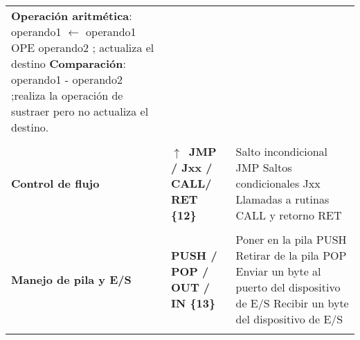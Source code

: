 \documentclass[12pt,twoside]{templates/unerthesis}
\begin{document}
\begin{longtable}[]{@{}lll@{}}
\begin{minipage}[t]{0.30\columnwidth}
\textbf{Operación aritmética}: operando1 \(\leftarrow\) operando1 OPE operando2 ; actualiza el destino \textbf{Comparación}: operando1 - operando2 ;realiza la operación de sustraer pero no actualiza el destino.\strut
\end{minipage}\tabularnewline
\begin{minipage}[t]{0.30\columnwidth}\raggedright
\strut
\end{minipage} & \begin{minipage}[t]{0.30\columnwidth}\raggedright
\strut
\end{minipage} & \begin{minipage}[t]{0.30\columnwidth}\raggedright
\strut
\end{minipage}\tabularnewline
\begin{minipage}[t]{0.30\columnwidth}\raggedright
\textbf{Control de flujo}\strut
\end{minipage} & \begin{minipage}[t]{0.30\columnwidth}\raggedright
\textbf{\(\uparrow\)~JMP / Jxx / CALL/ RET \{12\}}\strut
\end{minipage} & \begin{minipage}[t]{0.30\columnwidth}\raggedright
Salto incondicional JMP Saltos condicionales Jxx Llamadas a rutinas CALL y retorno RET\strut
\end{minipage}\tabularnewline
\begin{minipage}[t]{0.30\columnwidth}\raggedright
\strut
\end{minipage} & \begin{minipage}[t]{0.30\columnwidth}\raggedright
\strut
\end{minipage} & \begin{minipage}[t]{0.30\columnwidth}\raggedright
\strut
\end{minipage}\tabularnewline
\begin{minipage}[t]{0.30\columnwidth}\raggedright
\textbf{Manejo de pila y E/S}\strut
\end{minipage} & \begin{minipage}[t]{0.30\columnwidth}\raggedright
\textbf{PUSH / POP / OUT / IN \{13\}}\strut
\end{minipage} & \begin{minipage}[t]{0.30\columnwidth}\raggedright
Poner en la pila PUSH Retirar de la pila POP Enviar un byte al puerto del dispositivo de E/S Recibir un byte del dispositivo de E/S\strut
\end{minipage}\tabularnewline
\begin{minipage}[t]{0.30\columnwidth}\raggedright

\end{minipage}
\end{longtable}
\end{document}
